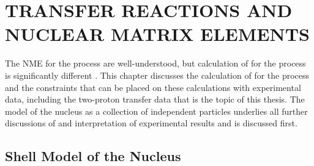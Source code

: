 %
%
%
%
%
%
%
%

%
%

\chapter{TRANSFER REACTIONS AND NUCLEAR MATRIX ELEMENTS}
\label{chap:nucl}

The NME for the \tvbb process are well-understood, but calculation of \NME for the \zvbb process is significantly different \cite{VogelReview}.  This chapter discusses the calculation of \NME for the \zvbb process and the constraints that can be placed on these calculations with experimental data, including the two-proton transfer data that is the topic of this thesis.  The model of the nucleus as a collection of independent particles underlies all further discussions of \NME and interpretation of experimental results and is discussed first.    

\section{Shell Model of the Nucleus}

